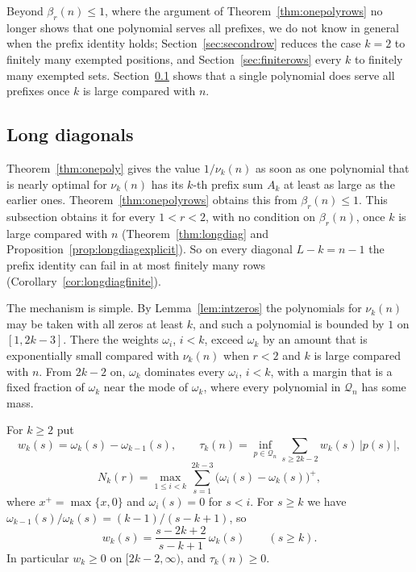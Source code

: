 \documentclass[11pt]{article}
\begin{document}
Beyond $\beta_r(n)\le1$, where the argument of Theorem~\ref{thm:onepolyrows}
no longer shows that one polynomial serves all prefixes,
we do not know in general when the prefix identity holds;
Section~\ref{sec:secondrow} reduces the case $k=2$ to finitely many exempted
positions, and Section~\ref{sec:finiterows} every $k$ to finitely many
exempted sets.  Section~\ref{sec:longdiag} shows that a
single polynomial does serve all prefixes once $k$ is large compared with
$n$.

\subsection{Long diagonals}\label{sec:longdiag}

Theorem~\ref{thm:onepoly} gives the value $1/\nu_k(n)$ as soon
as one polynomial that is nearly optimal for $\nu_k(n)$ has its $k$-th
prefix sum $A_k$ at least as large as the earlier ones.
Theorem~\ref{thm:onepolyrows} obtains this from $\beta_r(n)\le1$.  This
subsection obtains it for every $1<r<2$, with no condition on $\beta_r(n)$,
once $k$ is large compared with $n$ (Theorem~\ref{thm:longdiag} and
Proposition~\ref{prop:longdiagexplicit}).  So on every diagonal
$L-k=n-1$ the prefix identity can fail in at most finitely many rows
(Corollary~\ref{cor:longdiagfinite}).

The mechanism is simple.  By Lemma~\ref{lem:intzeros} the polynomials for
$\nu_k(n)$ may be taken with all zeros at least $k$, and such a polynomial is
bounded by $1$ on $[1,2k-3]$.  There the weights $\omega_i$, $i<k$, exceed
$\omega_k$ by an amount that is exponentially small compared with $\nu_k(n)$
when $r<2$ and $k$ is large compared with $n$.  From $2k-2$ on, $\omega_k$ dominates every $\omega_i$, $i<k$,
with a margin that is a fixed fraction of $\omega_k$ near the mode of
$\omega_k$, where every polynomial in $\mathcal Q_n$ has some mass.

For $k\ge2$ put
\[
  w_k(s)=\omega_k(s)-\omega_{k-1}(s),\qquad
  \tau_k(n)=\inf_{p\in\mathcal Q_n}\sum_{s\ge2k-2}w_k(s)\,|p(s)|,
\]
\[
  N_k(r)=\max_{1\le i<k}\sum_{s=1}^{2k-3}\bigl(\omega_i(s)-\omega_k(s)\bigr)^+,
\]
where $x^+=\max\{x,0\}$ and $\omega_i(s)=0$ for $s<i$.  For $s\ge k$ we have
$\omega_{k-1}(s)/\omega_k(s)=(k-1)/(s-k+1)$, so
\begin{equation}\label{eq:wkratio}
  w_k(s)=\frac{s-2k+2}{s-k+1}\,\omega_k(s)\qquad(s\ge k).
\end{equation}
In particular $w_k\ge0$ on $[2k-2,\infty)$, and $\tau_k(n)\ge0$.
\end{document}
